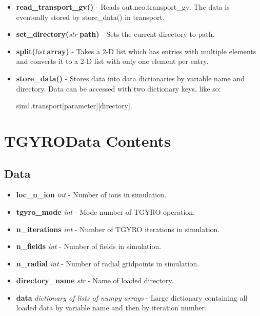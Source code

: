 \documentclass{article}
\begin{document}
\begin{itemize}
\item \textbf{read\_transport\_gv()} - Reads out.neo.transport\_gv.  The data is eventually stored by store\_data() in transport.
\item \textbf{set\_directory(}\emph{str} \textbf{path)} - Sets the current directory to path.
\item \textbf{split(}\emph{list} \textbf{array)} - Takes a 2-D list which has entries with multiple elements and converts it to a 2-D list with only one element per entry.
\item \textbf{store\_data()} - Stores data into data dictionaries by variable name and directory.  Data can be accessed with two dictionary keys, like so:

sim1.transport[parameter][directory].
\end{itemize}

\newpage
\section{TGYROData Contents}
\subsection{Data}
\begin{itemize}
\item \textbf{loc\_n\_ion} \emph{int} - Number of ions in simulation.
\item \textbf{tgyro\_mode} \emph{int} - Mode number of TGYRO operation.
\item \textbf{n\_iterations} \emph{int} - Number of TGYRO iterations in simulation.
\item \textbf{n\_fields} \emph{int} - Number of fields in simulation.
\item \textbf{n\_radial} \emph{int} - Number of radial gridpoints in simulation.
\item \textbf{directory\_name} \emph{str} - Name of loaded directory.
\item \textbf{data} \emph{dictionary of lists of numpy arrays} - Large dictionary containing all loaded data by variable name and then by iteration number.
\end{itemize}
\end{document}
